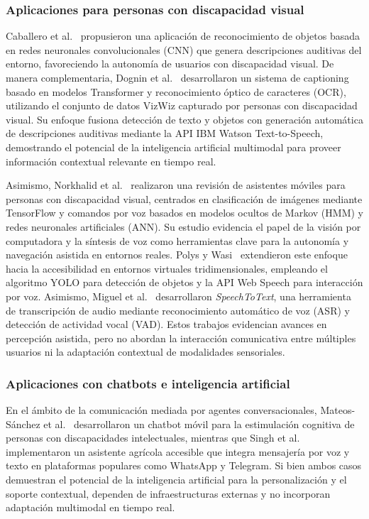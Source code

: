 \documentclass[lettersize,journal]{IEEEtran}
\begin{document}
            \subsubsection{Aplicaciones para personas con discapacidad visual}
                Caballero et al.~\cite{Caballero2020} propusieron una aplicación de reconocimiento de objetos basada en redes neuronales convolucionales (CNN) que genera descripciones auditivas del entorno, favoreciendo la autonomía de usuarios con discapacidad visual. De manera complementaria, Dognin et al.~\cite{Dognin2021} desarrollaron un sistema de captioning basado en modelos Transformer y reconocimiento óptico de caracteres (OCR), utilizando el conjunto de datos VizWiz capturado por personas con discapacidad visual. Su enfoque fusiona detección de texto y objetos con generación automática de descripciones auditivas mediante la API IBM Watson Text-to-Speech, demostrando el potencial de la inteligencia artificial multimodal para proveer información contextual relevante en tiempo real. 
                
                Asimismo, Norkhalid et al.~\cite{Norkhalid2020} realizaron una revisión de asistentes móviles para personas con discapacidad visual, centrados en clasificación de imágenes mediante TensorFlow y comandos por voz basados en modelos ocultos de Markov (HMM) y redes neuronales artificiales (ANN). Su estudio evidencia el papel de la visión por computadora y la síntesis de voz como herramientas clave para la autonomía y navegación asistida en entornos reales. Polys y Wasi~\cite{Polys2023} extendieron este enfoque hacia la accesibilidad en entornos virtuales tridimensionales, empleando el algoritmo YOLO para detección de objetos y la API Web Speech para interacción por voz. Asimismo, Miguel et al.~\cite{Negrao2021} desarrollaron \textit{SpeechToText}, una herramienta de transcripción de audio mediante reconocimiento automático de voz (ASR) y detección de actividad vocal (VAD). Estos trabajos evidencian avances en percepción asistida, pero no abordan la interacción comunicativa entre múltiples usuarios ni la adaptación contextual de modalidades sensoriales.
                    
            \subsubsection{Aplicaciones con chatbots e inteligencia artificial}
                En el ámbito de la comunicación mediada por agentes conversacionales, Mateos-Sánchez et al.~\cite{MateosSanchez2022} desarrollaron un chatbot móvil para la estimulación cognitiva de personas con discapacidades intelectuales, mientras que Singh et al.~\cite{Singh2024} implementaron un asistente agrícola accesible que integra mensajería por voz y texto en plataformas populares como WhatsApp y Telegram. Si bien ambos casos demuestran el potencial de la inteligencia artificial para la personalización y el soporte contextual, dependen de infraestructuras externas y no incorporan adaptación multimodal en tiempo real.
                
\end{document}
